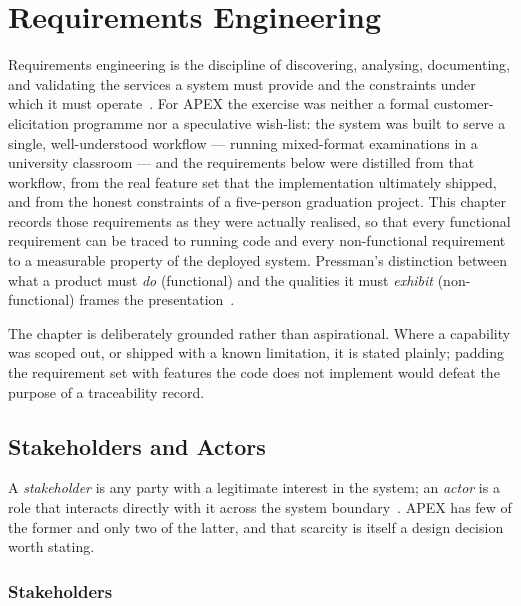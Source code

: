 \chapter{Requirements Engineering}\label{ch:ch03}

Requirements engineering is the discipline of discovering, analysing, documenting,
and validating the services a system must provide and the constraints under which it
must operate~\cite{sommerville-se}. For APEX the exercise was neither a formal
customer-elicitation programme nor a speculative wish-list: the system was built to
serve a single, well-understood workflow --- running mixed-format examinations in a
university classroom --- and the requirements below were distilled from that workflow,
from the real feature set that the implementation ultimately shipped, and from the
honest constraints of a five-person graduation project. This chapter records those
requirements as they were actually realised, so that every functional requirement can
be traced to running code and every non-functional requirement to a measurable
property of the deployed system. Pressman's distinction between what a product must
\emph{do} (functional) and the qualities it must \emph{exhibit} (non-functional)
frames the presentation~\cite{pressman-se}.

The chapter is deliberately grounded rather than aspirational. Where a capability was
scoped out, or shipped with a known limitation, it is stated plainly; padding the
requirement set with features the code does not implement would defeat the purpose of a
traceability record.

\section{Stakeholders and Actors}
\label{sec:req-stakeholders}

A \emph{stakeholder} is any party with a legitimate interest in the system; an
\emph{actor} is a role that interacts directly with it across the system
boundary~\cite{sommerville-se}. APEX has few of the former and only two of the latter,
and that scarcity is itself a design decision worth stating.

\subsection{Stakeholders}

